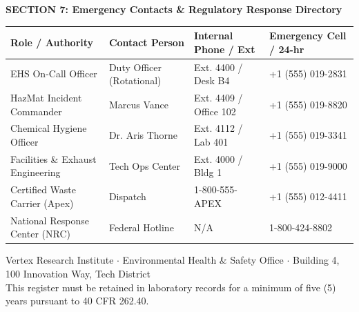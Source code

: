 \documentclass[10pt,a4paper]{article}
\begin{document}
\vspace{4pt}

\begin{tcolorbox}[colback=NavyPrimary, colframe=NavyPrimary, arc=2pt, top=2.5pt, bottom=2.5pt, left=6pt]
  \color{white}\bfseries\small\faPhone\quad SECTION 7: Emergency Contacts \& Regulatory Response Directory
\end{tcolorbox}

\vspace{-4pt}

\begin{tcolorbox}[
  enhanced,
  colback=SlateLight,
  colframe=SlateMid,
  arc=3pt,
  boxrule=0.5pt,
  left=6pt, right=6pt, top=4pt, bottom=4pt
]
  \fontsize{7.5}{9}\selectfont
  \begin{tabularx}{\textwidth}{@{} Y p{2.8cm} p{2.8cm} p{2.8cm} @{}}
    \toprule
    \textbf{Role / Authority} & \textbf{Contact Person} & \textbf{Internal Phone / Ext} & \textbf{Emergency Cell / 24-hr} \\
    \midrule
    EHS On-Call Officer & Duty Officer (Rotational) & Ext. 4400 / Desk B4 & +1 (555) 019-2831 \\
    HazMat Incident Commander & Marcus Vance & Ext. 4409 / Office 102 & +1 (555) 019-8820 \\
    Chemical Hygiene Officer & Dr. Aris Thorne & Ext. 4112 / Lab 401 & +1 (555) 019-3341 \\
    Facilities \& Exhaust Engineering & Tech Ops Center & Ext. 4000 / Bldg 1 & +1 (555) 019-9000 \\
    Certified Waste Carrier (Apex) & Dispatch & 1-800-555-APEX & +1 (555) 012-4411 \\
    National Response Center (NRC) & Federal Hotline & N/A & 1-800-424-8802 \\
    \bottomrule
  \end{tabularx}
\end{tcolorbox}

\vspace{6pt}

\begin{center}
  \color{TextMuted}\tiny
  Vertex Research Institute $\cdot$ Environmental Health \& Safety Office $\cdot$ Building 4, 100 Innovation Way, Tech District\\
  This register must be retained in laboratory records for a minimum of five (5) years pursuant to 40 CFR 262.40.
\end{center}
\end{document}

